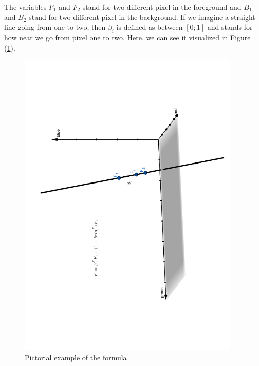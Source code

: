 The variables \(F_1\) and \(F_2\) stand for two different pixel in the foreground and \(B_1\) and  \(B_2\) stand for two different pixel in the background. If we imagine a straight line going from one to two, then  \(\beta_i\) is defined as between  \([0;1]\) and stands for how near we go from pixel one to two. Here, we can see it visualized in Figure (\ref{fig_formel}).

\begin{figure}[htb]
	\begin{center}
		\includegraphics[width=300pt, angle=270]{bilder/formel}
		\caption{Pictorial example of the formula}\label{fig_formel}
	\end{center}
\end{figure}

